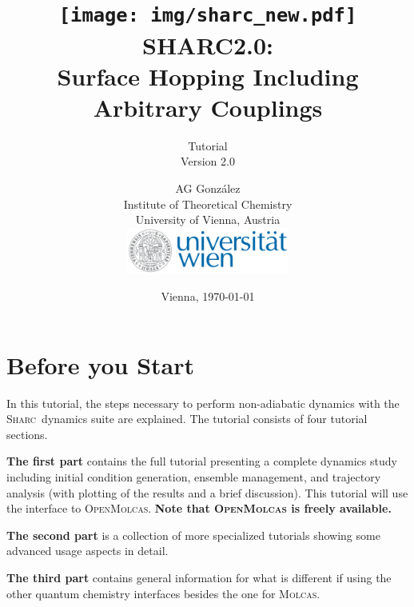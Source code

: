 \documentclass[a4paper,11pt,DIV=15,openany]{scrbook}
\title{\hspace{1cm}\texttt{[image: img/sharc\_new.pdf]}\\[0.5cm]
    SHARC2.0:\\ Surface Hopping Including\\ Arbitrary Couplings}
\subtitle{Tutorial\\[1cm]Version 2.0}
\date{Vienna, \today}
\author{AG Gonz\'alez\\
Institute of Theoretical Chemistry\\
University of Vienna, Austria
\vspace{1cm}
\\
\includegraphics[width=0.4\textwidth,keepaspectratio=true]{img/univie.pdf}}
\makeatletter
\newcommand{\ExternalLink}{%
      \tikz[x=1.2ex, y=1.2ex, baseline=-0.05ex]{%
          \begin{scope}[x=1ex, y=1ex]
              \clip (-0.1,-0.1) 
                  --++ (-0, 1.2) 
                  --++ (0.6, 0) 
                  --++ (0, -0.6) 
                  --++ (0.6, 0) 
                  --++ (0, -1);
              \path[draw, 
                  line width = 0.5, 
                  rounded corners=0.5] 
                  (0,0) rectangle (1,1);
          \end{scope}
          \path[draw, line width = 0.5] (0.5, 0.5) 
              -- (1, 1);
          \path[draw, line width = 0.5] (0.6, 1) 
              -- (1, 1) -- (1, 0.6);
          }
      }
\newcommand*{\link}{\begingroup\@makeother\#\@link}
\newcommand*{\@link}[2]{%
    \href{#1}{\ExternalLink\ifthenelse{\equal{#2}{}}{#1}{#2}}%
    \endgroup}
\newcommand{\sharc}{\textsc{Sharc}}
\newcommand{\todo}[1]{\textcolor{RL}{#1}}
\makeatother
\begin{document}
\tpage


\newpage
{}
\ohead{\leftmark\quad {\normalfont|} \quad\rightmark}
\ofoot[\pagemark]{\pagemark}


\tableofcontents


\chapter{Before you Start}

In this tutorial, the steps necessary to perform non-adiabatic dynamics with the \sharc\ dynamics suite are explained. 
The tutorial consists of four tutorial sections. 

\textbf{The first part} contains the full tutorial presenting a complete dynamics study including initial condition generation, ensemble management, and trajectory analysis (with plotting of the results and a brief discussion). 
This tutorial will use the interface to \textsc{OpenMolcas}.
\textbf{Note that \textsc{OpenMolcas} is freely available.}

\textbf{The second part} is a collection of more specialized tutorials showing some advanced usage aspects in detail.

\textbf{The third part} contains general information for what is different if using the other quantum chemistry interfaces besides the one for \textsc{Molcas}.
\end{document}
